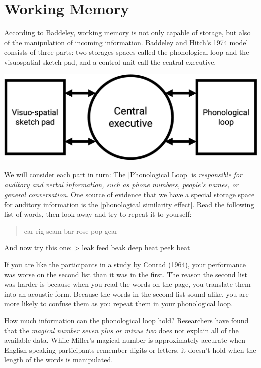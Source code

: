 \documentclass[
]{krantz}
\begin{document}
\hypertarget{working-memory}{%
\section{Working Memory}\label{working-memory}}

According to Baddeley, \protect\hyperlink{working-memory}{working memory} is not only capable of storage, but also of the manipulation of incoming information. Baddeley and Hitch's 1974 model consists of three parts: two storages spaces called the phonological loop and the visuospatial sketch pad, and a control unit call the central executive.

\begin{center}\includegraphics[width=0.6\linewidth]{images/ch4/fig2} \end{center}

We will consider each part in turn: The {[}Phonological Loop{]} is \emph{responsible for auditory and verbal information, such as phone numbers, people's names, or general conversation}. One source of evidence that we have a special storage space for auditory information is the {[}phonological similarity effect{]}. Read the following list of words, then look away and try to repeat it to yourself:

\begin{quote}
car rig seam bar rose pop gear
\end{quote}

And now try this one:
\textgreater{} leak feed beak deep heat peek beat

If you are like the participants in a study by Conrad (\protect\hyperlink{ref-conrad1964acoustic}{1964}), your performance was worse on the second list than it was in the first. The reason the second list was harder is because when you read the words on the page, you translate them into an acoustic form. Because the words in the second list sound alike, you are more likely to confuse them as you repeat them in your phonological loop.

How much information can the phonological loop hold? Researchers have found that the \emph{magical number seven plus or minus two} does not explain all of the available data. While Miller's magical number is approximately accurate when English-speaking participants remember digits or letters, it doesn't hold when the length of the words is manipulated.
\end{document}
